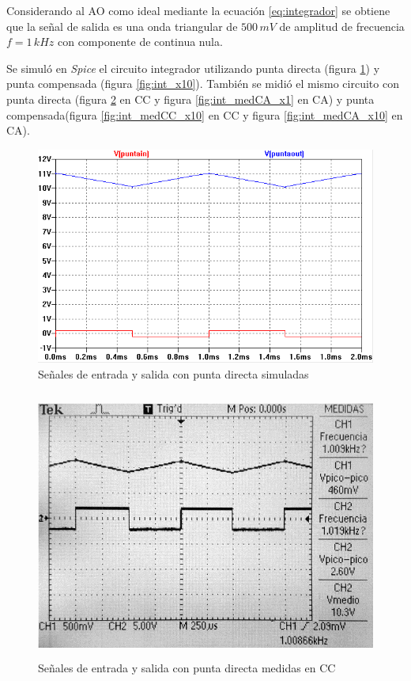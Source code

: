 \documentclass[10pt,spanish,a4paper,openany,notitlepage]{article}
\begin{document}
Considerando al AO como ideal mediante la ecuación \ref{eq:integrador} se obtiene que 
la señal de salida es una onda triangular de $500\,\unit{mV}$ de amplitud de frecuencia 
$f = 1\,\unit{kHz}$ con componente de continua nula.

Se simuló en \emph{Spice} el circuito integrador utilizando punta directa (figura
\ref{fig:int_x1}) y punta compensada (figura \ref{fig:int_x10}). También se midió el mismo
circuito con punta directa (figura \ref{fig:int_medCC_x1} en CC y figura \ref{fig:int_medCA_x1} en CA) y punta compensada(figura \ref{fig:int_medCC_x10} en CC y figura \ref{fig:int_medCA_x10} en CA).


\begin{figure}[H]
\centering
\includegraphics[scale=0.8]{simulaciones/BsinR2puntax1.png}
\caption{Señales de entrada y salida con punta directa simuladas}
\label{fig:int_x1}
\end{figure}

\begin{figure}[H]
\centering
\includegraphics[width=350pt, height=250pt]{mediciones/B-X1-CC.jpg}
\caption{Señales de entrada y salida con punta directa medidas en CC}
\label{fig:int_medCC_x1}
\end{figure}
\end{document}
